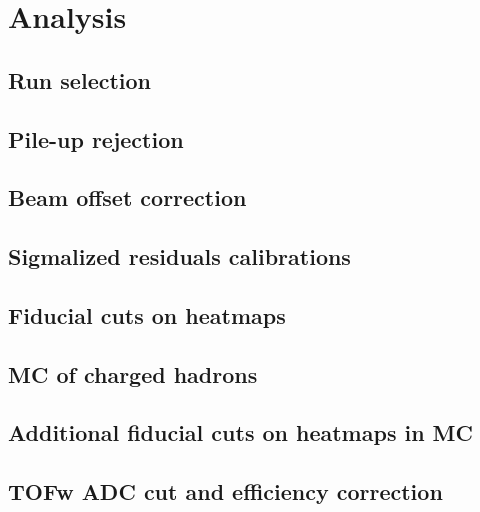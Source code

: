 \section{Analysis}

\subsection{Run selection}
\label{sec:run_selection}


\subsection{Pile-up rejection}
\label{sec:pile_up_rejection}


\subsection{Beam offset correction}
\label{sec:beam_offset_correction}


\subsection{Sigmalized residuals calibrations}
\label{sec:sigm_res_cal}


\subsection{Fiducial cuts on heatmaps}
\label{sec:fiducial_cuts}


\subsection{MC of charged hadrons}
\label{sec:mc_charged_hadrons}


\subsection{Additional fiducial cuts on heatmaps in MC}
\label{sec:additional_fiducial_cuts}


\subsection{TOFw ADC cut and efficiency correction}
\label{sec:tofw_adc_cut}


